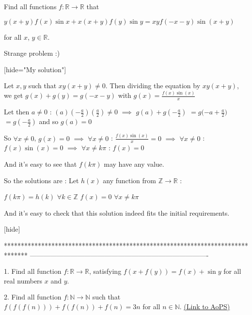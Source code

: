 \begin{solution}
	\begin{tcolorbox}Find all functions $ f: \mathbb{R}\to\mathbb{R}$ that 

$ y(x + y)f(x)\sin{x} + x(x + y)f(y)\sin{y} = xyf( - x - y)\sin{(x + y)}$ 

for all $ x$, $ y\in\mathbb{R}$.\end{tcolorbox}

Strange problem :)

[hide="My solution"]

Let $ x,y$ such that $ xy(x + y)\neq 0$. Then dividing the equation by $ xy(x + y)$, we get $ g(x) + g(y) = g( - x - y)$ with $ g(x) = \frac {f(x)\sin(x)}{x}$ 

Let then $ a\neq 0$ : $ (a)( - \frac {a}{2})(\frac {a}{2})\neq 0$ $ \implies$ $ g(a) + g( - \frac a2)$ ${ = g( -a + \frac a2})$ $ = g( - \frac a2)$ and so $ g(a)=0$

So $ \forall x\neq 0$, $ g(x) = 0$ $ \implies$ $ \forall x\neq 0$ : $ \frac {f(x)\sin(x)}{x} = 0$ $ \implies$ $ \forall x\neq 0$ : $ f(x)\sin(x) = 0$ $ \implies$ $ \forall x\neq k\pi$ : $ f(x) = 0$

And it's easy to see that $ f(k\pi)$ may have any value.

So the solutions are :
Let $ h(x)$ any function from $ \mathbb Z\to\mathbb R$ :

$ f(k\pi) = h(k)$ $ \forall k\in\mathbb Z$
$ f(x) = 0$ $ \forall x\neq k\pi$

And it's easy to check that this solution indeed fits the initial requirements.

[\/hide]
\end{solution}
*******************************************************************************
-------------------------------------------------------------------------------

\begin{problem}
	1. Find all function $f: \mathbb R \to \mathbb R$, satisfying $f(x+f(y))=f(x)+ \sin y$ for all real numbers $x$ and $y$.

2. Find all function $f: \mathbb N \to \mathbb N$ such that $f(f(f(n))) +f(f(n)) +f(n) = 3n$ for all $n \in \mathbb N$.
	\flushright \href{https://artofproblemsolving.com/community/c6h230044}{(Link to AoPS)}
\end{problem}



